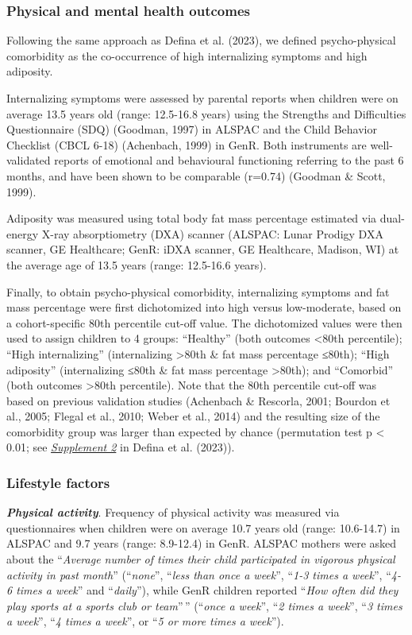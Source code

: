 \documentclass[
  letterpaper,
  DIV=11,
  numbers=noendperiod]{scrreport}
\begin{document}
\subsubsection{Physical and mental health
outcomes}\label{physical-and-mental-health-outcomes}

Following the same approach as Defina et al. (2023), we defined
psycho-physical comorbidity as the co-occurrence of high internalizing
symptoms and high adiposity.

Internalizing symptoms were assessed by parental reports when children
were on average 13.5 years old (range: 12.5-16.8 years) using the
Strengths and Difficulties Questionnaire (SDQ) (Goodman, 1997) in ALSPAC
and the Child Behavior Checklist (CBCL 6-18) (Achenbach, 1999) in GenR.
Both instruments are well-validated reports of emotional and behavioural
functioning referring to the past 6 months, and have been shown to be
comparable (r=0.74) (Goodman \& Scott, 1999).

Adiposity was measured using total body fat mass percentage estimated
via dual-energy X-ray absorptiometry (DXA) scanner (ALSPAC: Lunar
Prodigy DXA scanner, GE Healthcare; GenR: iDXA scanner, GE Healthcare,
Madison, WI) at the average age of 13.5 years (range: 12.5-16.6 years).

Finally, to obtain psycho-physical comorbidity, internalizing symptoms
and fat mass percentage were first dichotomized into high versus
low-moderate, based on a cohort-specific 80th percentile cut-off value.
The dichotomized values were then used to assign children to 4 groups:
``Healthy'' (both outcomes \textless80th percentile); ``High
internalizing'' (internalizing \textgreater80th \& fat mass percentage
≤80th); ``High adiposity'' (internalizing ≤80th \& fat mass percentage
\textgreater80th); and ``Comorbid'' (both outcomes \textgreater80th
percentile). Note that the 80th percentile cut-off was based on previous
validation studies (Achenbach \& Rescorla, 2001; Bourdon et al., 2005;
Flegal et al., 2010; Weber et al., 2014) and the resulting size of the
comorbidity group was larger than expected by chance (permutation test p
\textless{} 0.01; see \href{https://osf.io/xs29c}{\emph{Supplement 2}}
in Defina et al. (2023)).

\subsubsection{Lifestyle factors}\label{lifestyle-factors}

\textbf{\emph{Physical activity}}. Frequency of physical activity was
measured via questionnaires when children were on average 10.7 years old
(range: 10.6-14.7) in ALSPAC and 9.7 years (range: 8.9-12.4) in GenR.
ALSPAC mothers were asked about the ``\emph{Average number of times
their child participated in vigorous physical activity in past month}''
(``\emph{none}'', ``\emph{less than once a week}'', ``\emph{1-3 times a
week}'', ``\emph{4-6 times a week}'' and ``\emph{daily}''), while GenR
children reported ``\emph{How often did they play sports at a sports
club or team}''\,'' (``\emph{once a week}'', ``\emph{2 times a week}'',
``\emph{3 times a week}'', ``\emph{4 times a week}'', or ``\emph{5 or
more times a week}'').
\end{document}
